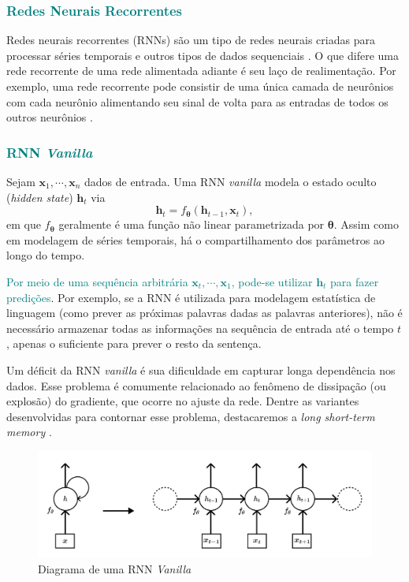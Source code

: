 \documentclass{automatextcc}
\newcommand{\nico}[1]{\textcolor{teal}{#1}}
\newcommand{\bs}[1]{\boldsymbol{#1}}
\begin{document}
            
\subsubsection{\nico{Redes Neurais Recorrentes}}
Redes neurais recorrentes (RNNs) são um tipo de redes neurais criadas para processar séries temporais e outros tipos de dados sequenciais \citep{fan2021}. O que difere uma rede recorrente de uma rede alimentada adiante é seu laço de realimentação. Por exemplo, uma rede recorrente pode consistir de uma única camada de neurônios com cada neurônio alimentando seu sinal de volta para as entradas de todos os outros neurônios \citep{haykin2009}. 



\subsubsection{\nico{RNN \textit{Vanilla}}}
Sejam $\bs{x}_{1},\cdots,\bs{x}_{n}$ dados de entrada. Uma  RNN \textit{vanilla} modela o estado oculto (\textit{hidden state}) $\bs{h}_{t}$ via
\begin{equation*}
    \bs{h}_t = f_{\bs{{\theta}}} (\bs{h}_{t-1}, \bs{x}_{t}),    
\end{equation*}
em que $f_{\bs{\theta}}$ geralmente é uma função não linear parametrizada por $\bs{\theta}$. Assim como em modelagem de séries temporais, há o compartilhamento dos parâmetros ao longo do tempo.

\nico{Por meio de uma sequência arbitrária $\bs{x}_{t},\cdots,\bs{x}_{1}$, pode-se utilizar $\bs{h}_{t}$ para fazer predições}. Por exemplo, se a RNN é utilizada para modelagem estatística de linguagem (como prever as próximas palavras dadas as palavras anteriores), não é necessário armazenar todas as informações na sequência de entrada até o tempo $t$, apenas o suficiente para prever o resto da sentença.

Um déficit da RNN \textit{vanilla} é sua dificuldade em capturar longa dependência nos dados. Esse problema é comumente relacionado ao fenômeno de dissipação (ou explosão) do gradiente, que ocorre no ajuste da rede. Dentre as variantes desenvolvidas para contornar esse problema, destacaremos a \textit{long short-term memory} \citep{goodfellow2016, fan2021}.
\begin{figure}
    \centering
    \includegraphics[width=\textwidth]{figuras/rnn_hidden_state.pdf}
	\caption{Diagrama de uma RNN \textit{Vanilla} \citep[adaptado de][]{goodfellow2016, kamath2019}}
\end{figure}
\end{document}
